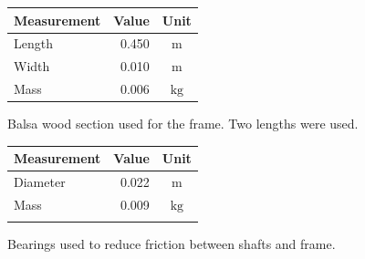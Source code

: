 \documentclass[a4paper]{article}
\begin{document}
\begin{figure}[h]
	\centering
	\begin{minipage}[t]{0.45\textwidth}
		\centering
		\begin{tabular}{p{3.5cm}rc}
			\toprule
			Measurement & Value & Unit \\
			\midrule
			Length & 0.450 & $\si{\meter}$ \\
			Width & 0.010 & $\si{\meter}$  \\
			Mass & 0.006 & $\si{\kilogram}$ \\
			\bottomrule
		\end{tabular}
		
		\vspace{0.5cm}
		
		\caption{Balsa wood section used for the frame. Two lengths were used.}
	\end{minipage}
	\hspace{1cm}
	\begin{minipage}[t]{0.45\textwidth}
		\centering
		\begin{tabular}{p{3.5cm}rc}
			\toprule
			Measurement & Value & Unit \\
			\midrule
			Diameter & 0.022 & $\si{\meter}$ \\
			Mass & 0.009 & $\si{\kilogram}$ \\
			 & & \\
			\bottomrule
		\end{tabular}
		
		\vspace{0.5cm}
		
		\caption{Bearings used to reduce friction between shafts and frame.}
	\end{minipage}
\end{figure}
\end{document}
